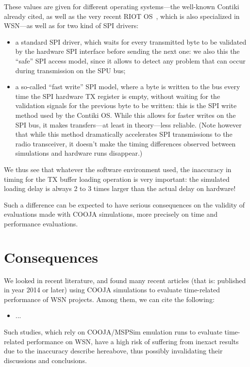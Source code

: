 \documentclass[a4paper,10pt]{article}
\begin{document}
These values are given for different operating systems---the well-known
Contiki already cited, as well as the very recent RIOT OS~\cite{RIOT},
which is also specialized in WSN---as well as for two kind of SPI drivers:
\begin{itemize}
\item a standard SPI driver, which waits for every transmitted byte to be
validated by the hardware SPI interface before sending the next one:
we also this the ``safe'' SPI access model, since it allows to detect
any problem that can occur during transmission on the SPU bus;
\item a so-called ``fast write'' SPI model, where a byte is written to
the bus every time the SPI hardware TX register is empty, without waiting
for the validation signals for the previous byte to be written: this is
the SPI write method used by the Contiki OS. While this allows for faster
writes on the SPI bus, it makes transfers---at least in theory---less
reliable. (Note however that while this method dramatically accelerates
SPI transmissions to the radio transceiver, it doesn't make the timing
differences observed between simulations and hardware runs disappear.)
\end{itemize}

We thus see that whatever the software environment used, the inaccuracy
in timing for the TX buffer loading operation is very important:
the simulated loading delay is always 2 to 3 times larger than
the actual delay on hardware!

Such a difference can be expected to have serious consequences on
the validity of evaluations made with COOJA simulations, more precisely
on time and performance evaluations.


\section{Consequences}

We looked in recent literature, and found many recent articles (that is:
published in year 2014 or later) using COOJA simulations to evaluate
time-related performance of WSN projects. Among them, we can cite
the following:
\begin{itemize}
\item ...
\end{itemize}

Such studies, which rely on COOJA/MSPSim emulation runs to evaluate
time-related performance on WSN, have a high risk of suffering from
inexact results due to the inaccuracy describe hereabove, thus
possibly invalidating their discussions and conclusions.
\end{document}
